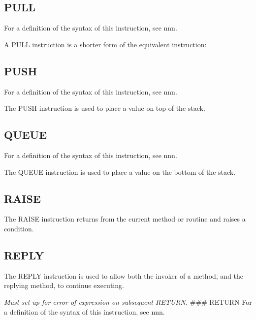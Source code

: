 \subsection{PULL}\label{pull}

For a definition of the syntax of this instruction, see nnn.

A PULL instruction is a shorter form of the equivalent instruction:



\subsection{PUSH}\label{push}

For a definition of the syntax of this instruction, see nnn.

The PUSH instruction is used to place a value on top of the stack.



\subsection{QUEUE}\label{queue}

For a definition of the syntax of this instruction, see nnn.

The QUEUE instruction is used to place a value on the bottom of the
stack.



\subsection{RAISE}\label{raise}

The RAISE instruction returns from the current method or routine and
raises a condition.

\subsection{REPLY}\label{reply}

The REPLY instruction is used to allow both the invoker of a method, and
the replying method, to continue executing.

\emph{Must set up for error of expression on subsequent RETURN.} \#\#\#
RETURN For a definition of the syntax of this instruction, see nnn.


